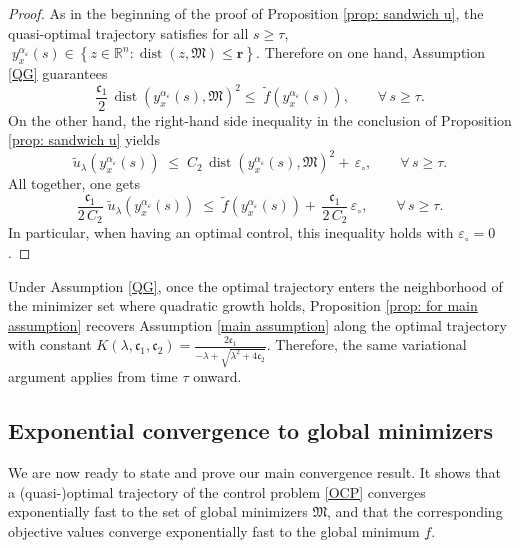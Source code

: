 \documentclass[12pt]{amsart}
\numberwithin{equation}{section}
\theoremstyle{plain}
\begin{document}
\begin{proof}
As in the beginning of the proof of Proposition \ref{prop: sandwich u}, the quasi-optimal trajectory satisfies for all $s\geq \tau$,  $\;y_{x}^{\alpha_{\varepsilon}}(s) \in \left\{z\in \mathbb{R}^{n}: \operatorname{dist}(z,\mathfrak{M})\leq \mathbf{r}\right\}$. Therefore on one hand, Assumption \ref{QG} guarantees
\begin{equation*}
    \frac{\mathfrak{c}_{1}}{2} \, \operatorname{dist}(y_{x}^{\alpha_{\varepsilon}}(s),\mathfrak M)^2 \le \; \tilde{f}(y_{x}^{\alpha_{\varepsilon}}(s)),  \quad\quad \forall\,s\geq \tau.
\end{equation*}
On the other hand, the right-hand side inequality in the conclusion of Proposition \ref{prop: sandwich u}  yields
\begin{equation*}
    \tilde{u}_{\lambda}(y_{x}^{\alpha_{\varepsilon}}(s)) \; \leq \; C_{2}\,\operatorname{dist}(y_{x}^{\alpha_{\varepsilon}}(s),\mathfrak{M})^{2} + \,\varepsilon_{\circ},  \quad\quad \forall\,s\geq \tau.
\end{equation*}
All together, one gets
\begin{equation*}
    \frac{\mathfrak{c}_{1}}{2\,C_{2}} \; \tilde{u}_{\lambda}(y_{x}^{\alpha_{\varepsilon}}(s)) \; \leq \; \tilde{f}(y_{x}^{\alpha_{\varepsilon}}(s))  + \,\frac{\mathfrak{c}_{1}}{2\,C_{2}}\,\varepsilon_{\circ} , \quad\quad \forall\,s\geq \tau.
\end{equation*}
In particular, when having an optimal control, this inequality holds with $\varepsilon_{\circ}=0$.
\end{proof}

Under Assumption \ref{QG}, once the optimal trajectory enters the neighborhood of the minimizer set where quadratic growth holds, Proposition \ref{prop: for main assumption} recovers Assumption \ref{main assumption} along the optimal trajectory with constant $K(\lambda, \mathfrak{c}_{1},\mathfrak{c}_{2})=\frac{2 \mathfrak{c}_{1}}{-\lambda+\sqrt{\lambda^2+4 \mathfrak{c}_{2}}}$. Therefore, the same variational argument applies from time $\tau$ onward.



\subsection{Exponential convergence to global minimizers}

We are now ready to state and prove our main convergence result. It shows that a (quasi-)optimal trajectory of the control problem  \eqref{OCP} converges exponentially fast to the set of global minimizers $\mathfrak{M}$, and that the corresponding objective values converge exponentially fast to the global minimum $\underline{f}$.
\end{document}
